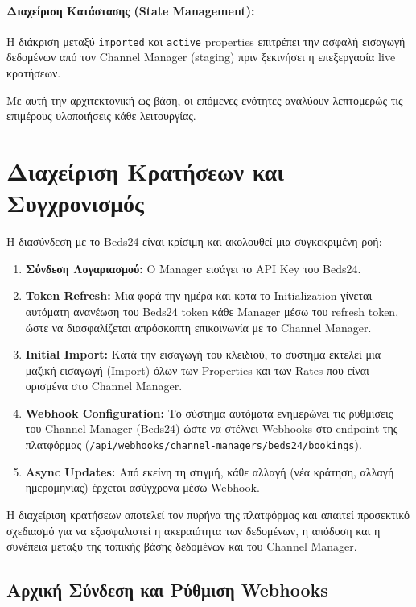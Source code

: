 \documentclass[
	12pt, %
	oneside, %
	greek,
	onehalfspacing, %
	liststotoc, %
	toctotoc, %
	parskip, %
	headsepline, %
]{MastersDoctoralThesis} %
\newcommand{\code}[1]{\texttt{#1}}
\begin{document}
\paragraph{Διαχείριση Κατάστασης (State Management):}
Η διάκριση μεταξύ \code{imported} και \code{active} properties επιτρέπει την ασφαλή εισαγωγή δεδομένων από τον Channel Manager (staging) πριν ξεκινήσει η επεξεργασία live κρατήσεων.

Με αυτή την αρχιτεκτονική ως βάση, οι επόμενες ενότητες αναλύουν λεπτομερώς τις επιμέρους υλοποιήσεις κάθε λειτουργίας.

\section{Διαχείριση Κρατήσεων και Συγχρονισμός}
\label{sec:booking-sync}

Η διασύνδεση με το Beds24 είναι κρίσιμη και ακολουθεί μια συγκεκριμένη ροή:

\begin{enumerate}
    \item \textbf{Σύνδεση Λογαριασμού:} Ο Manager εισάγει το API Key του Beds24.
    \item \textbf{Token Refresh:} Μια φορά την ημέρα και κατα το Initialization γίνεται αυτόματη ανανέωση του Beds24 token κάθε Manager μέσω του refresh token, ώστε να διασφαλίζεται απρόσκοπτη επικοινωνία με το Channel Manager.
    \item \textbf{Initial Import:} Κατά την εισαγωγή του κλειδιού, το σύστημα εκτελεί μια μαζική εισαγωγή (Import) όλων των Properties και των Rates που είναι ορισμένα στο Channel Manager.
    \item \textbf{Webhook Configuration:} Το σύστημα αυτόματα ενημερώνει τις ρυθμίσεις του Channel Manager (Beds24) ώστε να στέλνει Webhooks στο endpoint της πλατφόρμας (\code{/api/webhooks/channel-managers/beds24/bookings}).
    \item \textbf{Async Updates:} Από εκείνη τη στιγμή, κάθε αλλαγή (νέα κράτηση, αλλαγή ημερομηνίας) έρχεται ασύγχρονα μέσω Webhook.
\end{enumerate}

Η διαχείριση κρατήσεων αποτελεί τον πυρήνα της πλατφόρμας και απαιτεί προσεκτικό σχεδιασμό για να εξασφαλιστεί η ακεραιότητα των δεδομένων, η απόδοση και η συνέπεια μεταξύ της τοπικής βάσης δεδομένων και του Channel Manager.

\subsection{Αρχική Σύνδεση και Ρύθμιση Webhooks}
\label{subsec:initial-connection}
\end{document}
